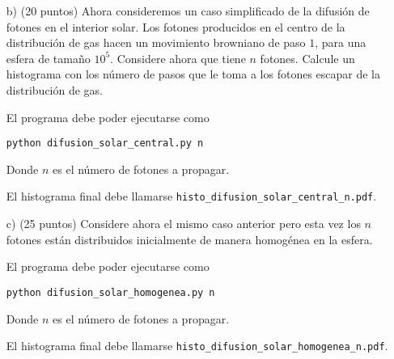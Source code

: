 \documentclass{article}
\begin{document}
\begin{enumerate}
\begin{itemize}
\item[b)] (20 puntos) Ahora consideremos un caso simplificado de la difusi\'on de fotones en el interior solar. Los fotones producidos
  en el centro de la distribuci\'on de gas hacen un movimiento
  browniano de paso $1$, para una esfera de tama\~no $10^5$. Considere
  ahora que tiene $n$ fotones. Calcule un histograma con los n\'umero
  de pasos que le toma a los fotones escapar de la distribuci\'on de gas.

  El programa debe poder ejecutarse como
\begin{verbatim}
python difusion_solar_central.py n
\end{verbatim}
Donde $n$ es el n\'umero de fotones a propagar. 


El histograma final
debe llamarse \verb"histo_difusion_solar_central_n.pdf".

\item[c)] (25 puntos) Considere ahora el mismo caso anterior pero esta vez los $n$ fotones est\'an distribuidos inicialmente de manera homog\'enea en
  la esfera.

El programa debe poder ejecutarse como

\begin{verbatim}
python difusion_solar_homogenea.py n
\end{verbatim}

Donde $n$ es el n\'umero de fotones a propagar. 

El histograma final
debe llamarse \verb"histo_difusion_solar_homogenea_n.pdf".

\end{itemize}

\end{enumerate}
\end{document}

